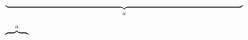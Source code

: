 \documentclass{article}
\begin{document}
$\underbrace{\makebox[10cm]{}}_a$

$\overbrace{\makebox[1cm]{}}^a$
\end{document}
